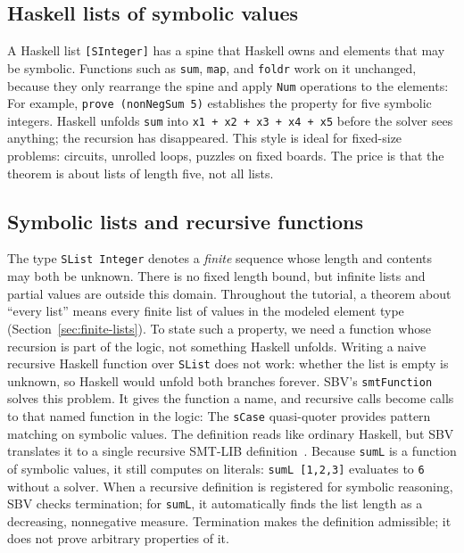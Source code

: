 \documentclass[review]{jfp-epi}
\newcommand{\code}[1]{\texttt{#1}}
\begin{document}
\subsection{Haskell lists of symbolic values}

A Haskell list \code{[SInteger]} has a spine that Haskell owns and elements that
may be symbolic. Functions such as \code{sum}, \code{map}, and \code{foldr} work
on it unchanged, because they only rearrange the spine and apply \code{Num}
operations to the elements:
For example, \code{prove (nonNegSum 5)} establishes the property for five
symbolic integers. Haskell
unfolds \code{sum} into \code{x1 + x2 + x3 + x4 + x5} before the solver sees
anything; the recursion has disappeared. This style is ideal for fixed-size
problems: circuits, unrolled loops, puzzles on fixed boards. The price is that
the theorem is about lists of length five, not all lists.

\subsection{Symbolic lists and recursive functions}

The type \code{SList Integer} denotes a \emph{finite} sequence whose length and
contents may both be unknown. There is no fixed length bound, but infinite lists
and partial values are outside this domain. Throughout the tutorial, a theorem
about ``every list'' means every finite list of values in the modeled element
type (Section~\ref{sec:finite-lists}). To state such a property, we need a function whose
recursion is part of the logic, not something Haskell unfolds. Writing a naive
recursive Haskell function over \code{SList} does not work: whether the list is
empty is unknown, so Haskell would unfold both branches forever.
SBV's \code{smtFunction} solves this problem. It gives the function a name, and
recursive calls become calls to that named function in the logic:
The \code{sCase} quasi-quoter provides pattern matching on symbolic values. The
definition reads like ordinary Haskell, but SBV translates it to a single
recursive SMT-LIB definition~\citep{smtlib}. Because \code{sumL} is a function
of symbolic values, it still computes on literals: \code{sumL [1,2,3]} evaluates
to \code{6} without a solver. When a recursive definition is registered for
symbolic reasoning, SBV checks termination; for \code{sumL}, it automatically
finds the list length as a decreasing, nonnegative measure. Termination makes
the definition admissible; it does not prove arbitrary properties of it.
\end{document}
